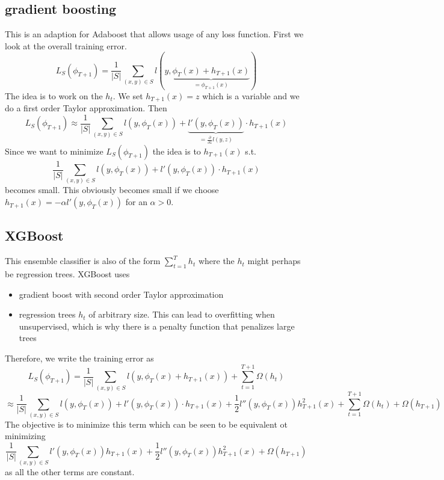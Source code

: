 \documentclass[a4paper, 12pt]{article}
\theoremstyle{plain}
\theoremstyle{definition}
\theoremstyle{lemma}
\theoremstyle{remark}
\theoremstyle{example}
\begin{document}
	\subsection{gradient boosting}
	This is an adaption for Adaboost that allows usage of any loss function. First we look at the overall training error. \[L_S(\phi_{T+1}) = \frac{1}{\left|S\right|} \sum_{(x,y) \in S} l(y,\underbrace{\phi_T(x) + h_{T+1}(x)}_{ = \phi_{T+1}(x)})\] The idea is to work on the $h_t$. We set $h_{T+1}(x) = z$ which is a variable and we do a first order Taylor approximation. Then \[L_S(\phi_{T+1}) \approx \frac{1}{\left|S\right|} \sum_{(x,y) \in S}l(y,\phi_T(x)) + \underbrace{l'(y,\phi_T(x))}_{= \frac{\partial}{\partial z} l(y,z)}\cdot h_{T+1}(x)\] Since we want to minimize $L_S(\phi_{T+1})$ the idea is to $h_{T+1}(x)$ s.t. \[\frac{1}{\left|S\right|} \sum_{(x,y) \in S}l(y,\phi_T(x)) + l'(y,\phi_T(x))\cdot h_{T+1}(x)\] becomes small. This obviously becomes small if we choose $h_{T+1}(x) = -\alpha l'(y,\phi_T(x))$ for an $\alpha > 0$.
	\subsection{XGBoost}
	This ensemble classifier is also of the form $\sum_{t=1}^T h_t$ where the $h_t$ might perhaps be regression trees. XGBoost uses \begin{itemize}
		\item gradient boost with second order Taylor approximation
		\item regression trees $h_t$ of arbitrary size. This can lead to overfitting when unsupervised, which is why there is a penalty function that penalizes large trees 
	\end{itemize} 
	Therefore, we write the training error as \[L_S(\phi_{T+1}) = \frac{1}{\left|S\right|} \sum_{(x,y) \in S} l(y,\phi_T(x) + h_{T+1}(x)) + \sum_{t=1}^{T+1} \Omega(h_t) \]\[\approx \frac{1}{\left|S\right|} \sum_{(x,y) \in S} l(y,\phi_T(x)) + l'(y,\phi_T(x))\cdot h_{T+1}(x) + \frac{1}{2}l''(y,\phi_T(x))h_{T+1}^2(x) + \sum_{t=1}^{T+1} \Omega(h_t) + \Omega(h_{T+1})\] The objective is to minimize this term which can be seen to be equivalent ot minimizing \[\frac{1}{\left|S\right|} \sum_{(x,y) \in S} l'(y,\phi_T(x))h_{T+1}(x) + \frac{1}{2} l''(y,\phi_T(x))h_{T+1}^2(x) + \Omega(h_{T+1})\] as all the other terms are constant.
\end{document}
